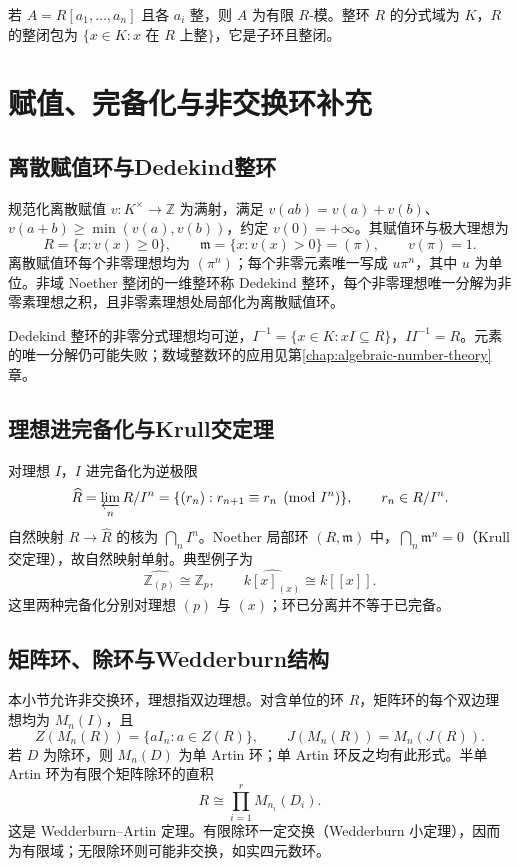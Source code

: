 \documentclass[../main.tex]{subfiles}
\begin{document}
若 $A=R[a_1,\ldots,a_n]$ 且各 $a_i$ 整，则 $A$ 为有限 $R$-模。整环 $R$ 的分式域为 $K$，$R$ 的整闭包为 $\{x\in K:x\text{ 在 }R\text{ 上整}\}$，它是子环且整闭。

\section{赋值、完备化与非交换环补充}
\subsection{离散赋值环与Dedekind整环}
规范化离散赋值 $v:K^\times\to\mathbb Z$ 为满射，满足 $v(ab)=v(a)+v(b)$、$v(a+b)\ge\min(v(a),v(b))$，约定 $v(0)=+\infty$。其赋值环与极大理想为
\[
R=\{x:v(x)\ge0\},\qquad\mathfrak m=\{x:v(x)>0\}=(\pi),\qquad v(\pi)=1.
\]
离散赋值环每个非零理想均为 $(\pi^n)$；每个非零元素唯一写成 $u\pi^n$，其中 $u$ 为单位。非域 Noether 整闭的一维整环称 Dedekind 整环，每个非零理想唯一分解为非零素理想之积，且非零素理想处局部化为离散赋值环。

Dedekind 整环的非零分式理想均可逆，$I^{-1}=\{x\in K:xI\subseteq R\}$，$II^{-1}=R$。元素的唯一分解仍可能失败；数域整数环的应用见第\ref{chap:algebraic-number-theory}章。

\subsection{理想进完备化与Krull交定理}
对理想 $I$，$I$ 进完备化为逆极限
\[
\widehat R=\varprojlim_nR/I^n
=\{(r_n):r_{n+1}\equiv r_n\pmod{I^n}\},\qquad r_n\in R/I^n.
\]
自然映射 $R\to\widehat R$ 的核为 $\bigcap_n I^n$。Noether 局部环 $(R,\mathfrak m)$ 中，$\bigcap_n\mathfrak m^n=0$（Krull 交定理），故自然映射单射。典型例子为
\[
\widehat{\mathbb Z_{(p)}}\cong\mathbb Z_p,\qquad
\widehat{k[x]_{(x)}}\cong k[[x]].
\]
这里两种完备化分别对理想 $(p)$ 与 $(x)$；环已分离并不等于已完备。

\subsection{矩阵环、除环与Wedderburn结构}
本小节允许非交换环，理想指双边理想。对含单位的环 $R$，矩阵环的每个双边理想均为 $M_n(I)$，且
\[
Z(M_n(R))=\{aI_n:a\in Z(R)\},\qquad
J(M_n(R))=M_n(J(R)).
\]
若 $D$ 为除环，则 $M_n(D)$ 为单 Artin 环；单 Artin 环反之均有此形式。半单 Artin 环为有限个矩阵除环的直积
\[
R\cong\prod_{i=1}^rM_{n_i}(D_i).
\]
这是 Wedderburn--Artin 定理。有限除环一定交换（Wedderburn 小定理），因而为有限域；无限除环则可能非交换，如实四元数环。
\end{document}
